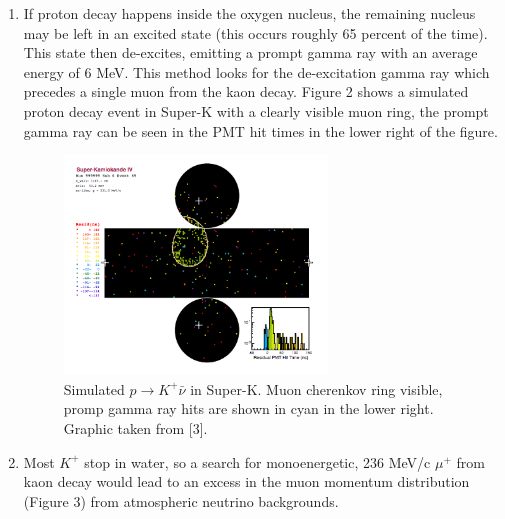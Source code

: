 \documentclass[aps,onecolumn,twoside,secnumarabic,balancelastpage,amsmath,amssymb,nofootinbib,hyperref=pdftex]{revtex4}
\begin{document}
\begin{enumerate}
\item If proton decay happens inside the oxygen nucleus, the remaining nucleus may be left in an excited state (this occurs roughly 65 percent of the time). This state then de-excites, emitting a prompt gamma ray with an average energy of 6 MeV. This method looks for the de-excitation gamma ray which precedes a single muon from the kaon decay. Figure 2 shows a simulated proton decay event in Super-K with a clearly visible muon ring, the prompt gamma ray can be seen in the PMT hit times in the lower right of the figure. 

\begin{figure}[htbp]
\begin{center}
\includegraphics[width=7cm]{kaon_decay.png}
\caption{Simulated $p \rightarrow K^{+}\bar{\nu}$ in Super-K. Muon cherenkov ring visible, promp gamma ray hits are shown in cyan in the lower right. Graphic taken from [3].}
\label{default}
\end{center}
\end{figure}

\item Most $K^{+}$ stop in water, so a search for monoenergetic, 236 MeV/c $\mu^{+}$ from kaon decay would lead to an excess in the muon momentum distribution (Figure 3) from atmospheric neutrino backgrounds. 


\end{enumerate}
\end{document}
